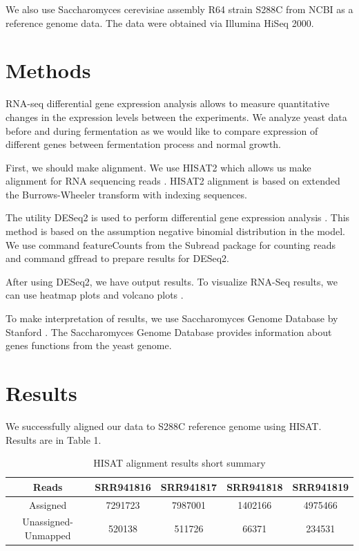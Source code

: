 \documentclass{article}
\begin{document}
We also use Saccharomyces cerevisiae assembly R64  strain S288C from NCBI \cite{ncb} as a reference genome data. The data were obtained via  	Illumina HiSeq 2000.  %


\section{Methods}
 RNA-seq differential gene expression analysis allows to measure  quantitative changes in the expression levels between the experiments.  We analyze yeast data before and during fermentation as we would like to compare expression of  different genes between  fermentation process and normal growth. 
 
 First, we should make alignment. We use HISAT2 which allows us make  alignment  for RNA sequencing reads \cite{hisat}. HISAT2 alignment is based on extended the Burrows-Wheeler transform  with indexing sequences. 
 
 The utility DESeq2 is used to perform differential gene expression analysis \cite{deseq}. This method is based on the assumption  negative binomial distribution in the model. We use command $\textrm{featureCounts}$ from the Subread package \cite{featurecounts} for counting reads and command $\textrm{gffread}$ \cite{gff} to prepare results for DESeq2. 
 
 After using DESeq2, we have output results. To visualize RNA-Seq results, we can use heatmap plots and volcano plots \cite{volcano}.   
 
   To make interpretation of results, we use Saccharomyces Genome Database  by Stanford \cite{ontology}. The Saccharomyces Genome Database provides information about genes functions  from the yeast genome. 
 
 
 \section{Results}
 
 	We successfully aligned  our data to S288C reference genome using HISAT. Results are in Table 1.
 
 
 	\begin{table}[h!]
 	\centering
 	\begin{tabular}{|c|c|c|c|c|}
 		\hline
 		Reads & SRR941816& SRR941817 & SRR941818 & SRR941819  \\
 		\hline
 	 Assigned	& 7291723&	7987001	&1402166	& 4975466 \\
 		\hline
 		 Unassigned-Unmapped &	520138 & 	511726&	66371	& 234531\\
 		\hline
  
 	\end{tabular}
 	\caption{  HISAT alignment results short summary }
 	\label{tab:2}
 \end{table}
 
\end{document}

